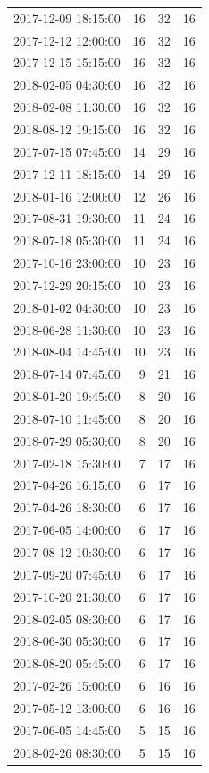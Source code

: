 \begin{tabular}{lrrr}
2017-12-09 18:15:00 & 16 & 32 & 16 \\
2017-12-12 12:00:00 & 16 & 32 & 16 \\
2017-12-15 15:15:00 & 16 & 32 & 16 \\
2018-02-05 04:30:00 & 16 & 32 & 16 \\
2018-02-08 11:30:00 & 16 & 32 & 16 \\
2018-08-12 19:15:00 & 16 & 32 & 16 \\
2017-07-15 07:45:00 & 14 & 29 & 16 \\
2017-12-11 18:15:00 & 14 & 29 & 16 \\
2018-01-16 12:00:00 & 12 & 26 & 16 \\
2017-08-31 19:30:00 & 11 & 24 & 16 \\
2018-07-18 05:30:00 & 11 & 24 & 16 \\
2017-10-16 23:00:00 & 10 & 23 & 16 \\
2017-12-29 20:15:00 & 10 & 23 & 16 \\
2018-01-02 04:30:00 & 10 & 23 & 16 \\
2018-06-28 11:30:00 & 10 & 23 & 16 \\
2018-08-04 14:45:00 & 10 & 23 & 16 \\
2018-07-14 07:45:00 & 9 & 21 & 16 \\
2018-01-20 19:45:00 & 8 & 20 & 16 \\
2018-07-10 11:45:00 & 8 & 20 & 16 \\
2018-07-29 05:30:00 & 8 & 20 & 16 \\
2017-02-18 15:30:00 & 7 & 17 & 16 \\
2017-04-26 16:15:00 & 6 & 17 & 16 \\
2017-04-26 18:30:00 & 6 & 17 & 16 \\
2017-06-05 14:00:00 & 6 & 17 & 16 \\
2017-08-12 10:30:00 & 6 & 17 & 16 \\
2017-09-20 07:45:00 & 6 & 17 & 16 \\
2017-10-20 21:30:00 & 6 & 17 & 16 \\
2018-02-05 08:30:00 & 6 & 17 & 16 \\
2018-06-30 05:30:00 & 6 & 17 & 16 \\
2018-08-20 05:45:00 & 6 & 17 & 16 \\
2017-02-26 15:00:00 & 6 & 16 & 16 \\
2017-05-12 13:00:00 & 6 & 16 & 16 \\
2017-06-05 14:45:00 & 5 & 15 & 16 \\
2018-02-26 08:30:00 & 5 & 15 & 16 \\

\end{tabular}
